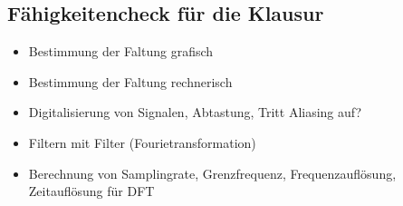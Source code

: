 \subsection{Fähigkeitencheck für die Klausur}
\begin{itemize}
	\item Bestimmung der Faltung grafisch %
	\item Bestimmung der Faltung rechnerisch %
	\item Digitalisierung von Signalen, Abtastung, Tritt Aliasing auf? %
	\item Filtern mit Filter (Fourietransformation) %
	\item Berechnung von Samplingrate, Grenzfrequenz, Frequenzauflösung, Zeitauflösung für DFT %
\end{itemize}
